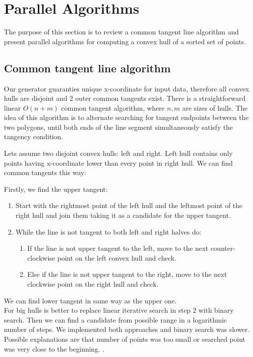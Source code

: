 \documentclass[letterpaper]{article}
\theoremstyle{definition}
\begin{document}
\section{Parallel Algorithms}\label{sec:yourmethod}

The purpose of this section is to review a common tangent line algorithm and present parallel algorithms for computing a convex hull of a sorted set of points.

\subsection{Common tangent line algorithm}

Our generator guaranties unique x-coordinate for input data, therefore all convex hulls are disjoint and 2 outer common tangents exist. There is a straightforward linear $O(n+m)$ common tangent algorithm, where $n,m$ are sizes of hulls. The idea of this algorithm is to alternate searching for tangent endpoints between the two polygons, until both ends of the line segment simultaneously satisfy the tangency condition. 

Lets assume two disjoint convex hulls: left and right. Left hull contains only points having x-coordinate lower than every point in right hull. We can find common tangents this way:
 
Firstly, we find the upper tangent:
	\begin{enumerate}
		\item Start with the rightmost point of the left hull and the leftmost point of the right hull and join them taking it as a candidate for the upper tangent.
		\item While the line is not tangent to both left and right halves do:
		\begin{enumerate}
			\item If the line is not upper tangent to the left, move to the next counter-clockwise point on the left convex hull and check.
			\item Else if the line is not upper tangent to the right, move to the next clockwise point on the right hull and check.
		\end{enumerate}
	\end{enumerate}
	 We can find lower tangent in same way as the upper one.\\ 

For big hulls is better to replace linear iterative search in step 2 with binary search. Then we can find a candidate from possible range in a logarithmic number of steps.       
We implemented both approaches and binary search was slower. Possible explanations are that number of points was too small or searched point was very close to the beginning.  . 
\end{document}

